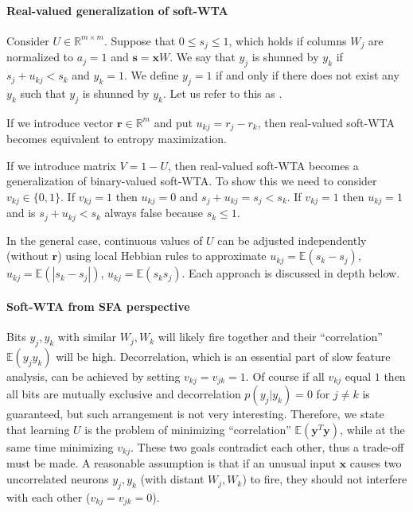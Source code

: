 \documentclass[12pt]{article}
\begin{document}
\paragraph{Real-valued generalization of soft-WTA}

Consider $U \in \mathbb{R}^{m\times m}$. Suppose that $0\le s_j\le 1$, which holds if columns $W_j$ are normalized to $a_j=1$ and $\boldsymbol{s}=\boldsymbol{x} W$. 
We say that $y_j$ is shunned by $y_k$ if  $s_j+u_{kj}<s_k$ and $y_k=1$. We define $y_j=1$ if and only if there does not exist any $y_k$ such that  $y_j$ is shunned by $y_k$. Let us refer to this as .

If we introduce vector $\boldsymbol{r}\in \mathbb{R}^m$ and put $u_{kj}=r_j-r_k$, then real-valued soft-WTA becomes equivalent to entropy maximization. 

If we introduce matrix $V=1-U$, then real-valued soft-WTA becomes a generalization of binary-valued soft-WTA. To show this we need to consider $v_{kj} \in \{0,1\}$. If $v_{kj}=1$ then $u_{kj}=0$ and $s_j+u_{kj}=s_j<s_k$. If $v_{kj}=1$ then $u_{kj}=1$ and is $s_j+u_{kj}<s_k$ always false because $s_k \le  1$. 

In the general case, continuous values of $U$ can be adjusted independently (without $\boldsymbol{r}$) using local Hebbian rules to approximate $u_{kj}=\mathbb{E}(s_k-s_j)$,  $u_{kj}=\mathbb{E}(|s_k-s_j|)$, $u_{kj}=\mathbb{E}(s_ks_j)$. Each approach is discussed in depth below. 


\paragraph{Soft-WTA from SFA perspective}
Bits $y_j,y_k$ with similar $W_j,W_k$ will likely fire together and their ``correlation'' $\mathbb{E}(y_j y_k)$ will be high. Decorrelation, which is an essential part of slow feature analysis, can be achieved by setting $v_{kj}=v_{jk}=1$. Of course if all $v_{kj}$ equal $1$ then all bits are mutually exclusive and decorrelation $p(y_j|y_k) = 0$ for $j\ne k$ is guaranteed, but such arrangement is not very interesting. Therefore, we state that learning $U$ is the problem of minimizing ``correlation'' $\mathbb{E}(\boldsymbol{y}^T \boldsymbol{y})$, while at the same time minimizing $v_{kj}$. These two goals contradict each other, thus a trade-off  must be made. A reasonable assumption is that if an unusual input $\boldsymbol{x}$ causes two uncorrelated neurons $y_j,y_k$ (with distant $W_j,W_k$) to fire, they should not interfere with each other ($v_{kj}=v_{jk}=0$). 
\end{document}
